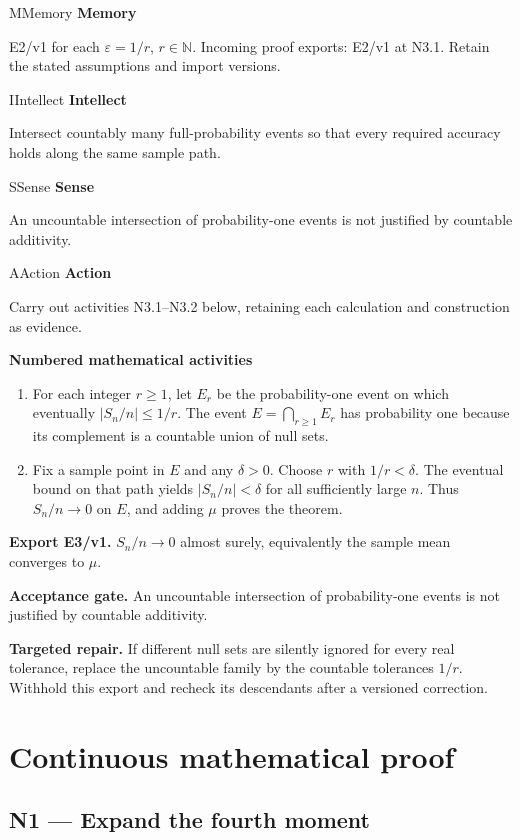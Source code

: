 \documentclass[preprint,12pt,aps,pra,showkeys,amsmath,amssymb,superscriptaddress,floatfix]{revtex4-2}
\theoremstyle{definition}
\theoremstyle{remark}
\newcommand{\mmfaculty}[3]{%
 \begin{mmfacultybox}{#1}{#2}
 {\sffamily\bfseries\color{MMBlue}#2}\par\smallskip #3
 \end{mmfacultybox}}
\newcommand{\field}[2]{\par\smallskip\noindent\textbf{#1.} #2\par}
\begin{document}
\mmfaculty{M}{Memory}{E2/v1 for each \(\varepsilon=1/r\), \(r\in\mathbb N\). Incoming proof
exports: E2/v1 at N3.1. Retain the stated assumptions and import
versions.}

\mmfaculty{I}{Intellect}{Intersect countably many full-probability events so that every required
accuracy holds along the same sample path.}

\mmfaculty{S}{Sense}{An uncountable intersection of probability-one events is not justified
by countable additivity.}

\mmfaculty{A}{Action}{Carry out activities N3.1--N3.2 below, retaining each calculation and
construction as evidence.}

\smallskip\noindent\textbf{Numbered mathematical activities}

\begin{enumerate}[label=N3.\arabic*,leftmargin=3.4em]

\item For each integer \(r\ge1\), let \(E_r\) be the probability-one event on
which eventually \(|S_n/n|\le1/r\). The event \(E=\bigcap_{r\ge1}E_r\)
has probability one because its complement is a countable union of null
sets.

\item Fix a sample point in \(E\) and any \(\delta>0\). Choose \(r\) with
\(1/r<\delta\). The eventual bound on that path yields
\(|S_n/n|<\delta\) for all sufficiently large \(n\). Thus \(S_n/n\to0\)
on \(E\), and adding \(\mu\) proves the theorem.

\end{enumerate}

\field{Export E3/v1}{\(S_n/n\to0\) almost surely, equivalently the sample mean converges to
\(\mu\).}

\field{Acceptance gate}{An uncountable intersection of probability-one events is not justified
by countable additivity.}

\field{Targeted repair}{If different null sets are silently ignored for every real tolerance,
replace the uncountable family by the countable tolerances \(1/r\).
Withhold this export and recheck its descendants after a versioned
correction.}

\endgroup\clearpage\section{Continuous mathematical proof}\label{sec:proof}

\subsection{N1 --- Expand the fourth
moment}\label{n1-expand-the-fourth-moment}
\end{document}
